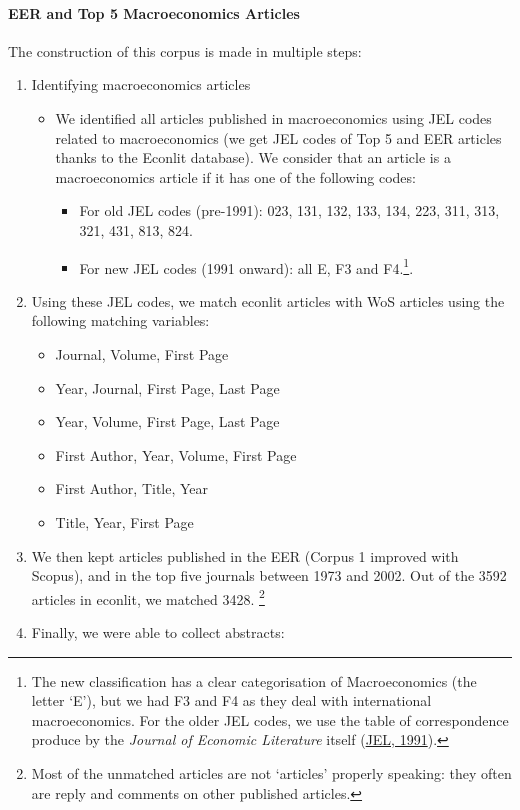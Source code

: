 \documentclass[
  12pt,
  onecolumn]{article}
\providecommand{\tightlist}{%
  \setlength{\itemsep}{0pt}\setlength{\parskip}{0pt}}
\begin{document}
\hypertarget{eer-top5-macro}{%
\paragraph*{EER and Top 5 Macroeconomics
Articles}\label{eer-top5-macro}}

The construction of this corpus is made in multiple steps:

\begin{enumerate}
\def\labelenumi{\arabic{enumi}.}
\item
  Identifying macroeconomics articles

  \begin{itemize}
  \item
    We identified all articles published in macroeconomics using JEL
    codes related to macroeconomics (we get JEL codes of Top 5 and EER
    articles thanks to the Econlit database). We consider that an
    article is a macroeconomics article if it has one of the following
    codes:

    \begin{itemize}
    \tightlist
    \item
      For old JEL codes (pre-1991): 023, 131, 132, 133, 134, 223, 311,
      313, 321, 431, 813, 824.
    \item
      For new JEL codes (1991 onward): all E, F3 and F4.\footnote{The
        new classification has a clear categorisation of Macroeconomics
        (the letter `E'), but we had F3 and F4 as they deal with
        international macroeconomics. For the older JEL codes, we use
        the table of correspondence produce by the \emph{Journal of
        Economic Literature} itself
        (\protect\hyperlink{ref-jel1991}{JEL, 1991}).}.
    \end{itemize}
  \end{itemize}
\item
  Using these JEL codes, we match econlit articles with WoS articles
  using the following matching variables:

  \begin{itemize}
  \tightlist
  \item
    Journal, Volume, First Page
  \item
    Year, Journal, First Page, Last Page
  \item
    Year, Volume, First Page, Last Page
  \item
    First Author, Year, Volume, First Page
  \item
    First Author, Title, Year
  \item
    Title, Year, First Page
  \end{itemize}
\item
  We then kept articles published in the EER (Corpus 1 improved with
  Scopus), and in the top five journals between 1973 and 2002. Out of
  the 3592 articles in econlit, we matched 3428. \footnote{Most of the
    unmatched articles are not `articles' properly speaking: they often
    are reply and comments on other published articles.}
\item
  Finally, we were able to collect abstracts:


\end{enumerate}
\end{document}
